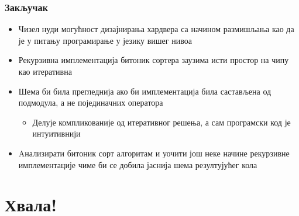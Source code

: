 \begin{frame}
\frametitle{Закључак}
\begin{itemize}
 \item Чизел нуди могућност дизајнирања хардвера са начином размишљања као да је у питању програмирање у језику вишег нивоа
 \item Рекурзивна имплементација битоник сортера заузима исти простор на чипу као итеративна
 \item Шема би била прегледнија ако би имплементација била састављена од подмодула, а не појединачних оператора
 \begin{itemize}
  \item Делује компликованије од итеративног решења, а сам програмски код је интуитивнији
 \end{itemize}
 \item Aнализирати битоник сорт алгоритам и уочити још неке начине рекурзивне имплементације чиме би се добила јаснија шема резултујућег кола
\end{itemize}
\end{frame}

\section{Хвала!}

%
%
%
%
%
%
%
%



